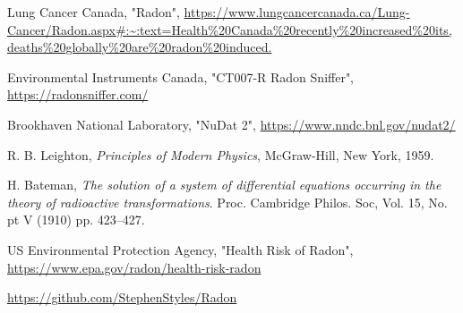 \documentclass[11pt]{m2pi}
\begin{document}
\begin{thebibliography}{99}



 Lung Cancer Canada, "Radon", \url{https://www.lungcancercanada.ca/Lung-Cancer/Radon.aspx#:~:text=Health\%20Canada\%20recently\%20increased\%20its,deaths\%20globally\%20are\%20radon\%20induced.}

 Environmental Instruments Canada, "CT007-R Radon Sniffer",
\url{https://radonsniffer.com/}

 Brookhaven National Laboratory, "NuDat 2", \url{https://www.nndc.bnl.gov/nudat2/}

 R. B. Leighton, \textit{Principles of Modern Physics}, McGraw-Hill, New York, 1959. 

 H. Bateman, \textit{The solution of a system of differential equations occurring in the theory of radioactive transformations}. Proc. Cambridge Philos. Soc, Vol. 15, No. pt V (1910) pp. 423–427.

 US Environmental Protection Agency, "Health Risk of Radon", \url{https://www.epa.gov/radon/health-risk-radon}

\url{https://github.com/StephenStyles/Radon}

\end{thebibliography}
\end{document}
